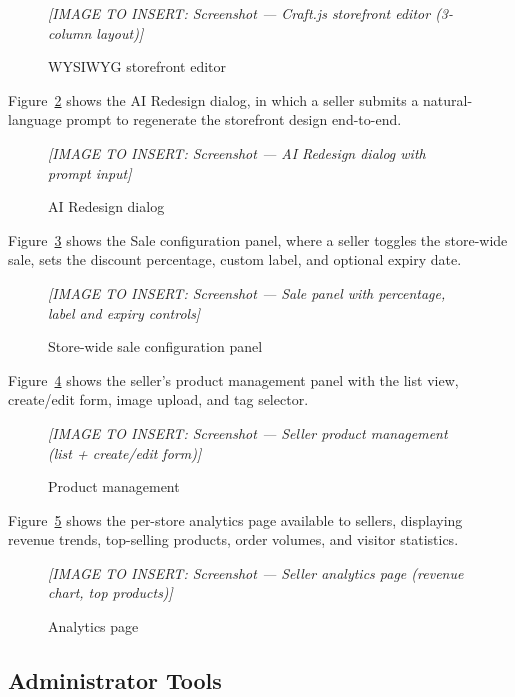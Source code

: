 \documentclass[12pt, a4paper, oneside]{report}
\newcommand{\imagePlaceholder}[2][8cm]{%
  \begin{mdframed}[backgroundcolor=cheebolightgray,linecolor=gray!40]
    \centering
    \vspace{#1}
    \textit{\color{gray}[IMAGE TO INSERT: #2]}
    \vspace{8mm}
  \end{mdframed}
}
\begin{document}
\begin{figure}[H]
  \centering
  \imagePlaceholder[8cm]{Screenshot — Craft.js storefront editor (3-column layout)}
  \caption{WYSIWYG storefront editor}
  \label{fig:craft-editor}
\end{figure}

Figure~\ref{fig:ai-redesign} shows the AI Redesign dialog, in which
a seller submits a natural-language prompt to regenerate the
storefront design end-to-end.

\begin{figure}[H]
  \centering
  \imagePlaceholder[6cm]{Screenshot — AI Redesign dialog with prompt input}
  \caption{AI Redesign dialog}
  \label{fig:ai-redesign}
\end{figure}

Figure~\ref{fig:sale-panel} shows the Sale configuration panel,
where a seller toggles the store-wide sale, sets the discount
percentage, custom label, and optional expiry date.

\begin{figure}[H]
  \centering
  \imagePlaceholder[8cm]{Screenshot — Sale panel with percentage, label and expiry controls}
  \caption{Store-wide sale configuration panel}
  \label{fig:sale-panel}
\end{figure}

Figure~\ref{fig:product-mgmt} shows the seller's product management
panel with the list view, create/edit form, image upload, and
tag selector.

\begin{figure}[H]
  \centering
  \imagePlaceholder[8cm]{Screenshot — Seller product management (list + create/edit form)}
  \caption{Product management}
  \label{fig:product-mgmt}
\end{figure}

Figure~\ref{fig:analytics} shows the per-store analytics page
available to sellers, displaying revenue trends, top-selling
products, order volumes, and visitor statistics.

\begin{figure}[H]
  \centering
  \imagePlaceholder[8cm]{Screenshot — Seller analytics page (revenue chart, top products)}
  \caption{Analytics page}
  \label{fig:analytics}
\end{figure}

\subsection{Administrator Tools}
\end{document}
